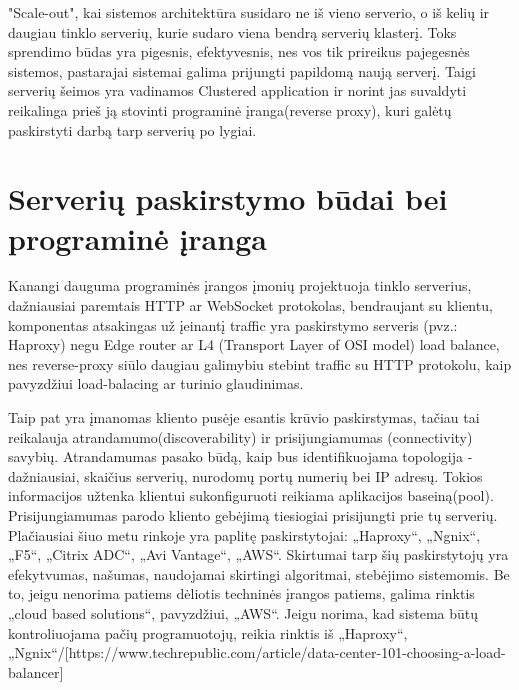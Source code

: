\documentclass{VUMIFPSkursinis}
\begin{document}
"Scale-out", kai sistemos architektūra susidaro ne iš vieno serverio, o iš kelių ir daugiau tinklo serverių, kurie sudaro viena bendrą serverių klasterį. Toks sprendimo būdas yra pigesnis, efektyvesnis, nes vos tik prireikus pajegesnės sistemos, pastarajai sistemai galima prijungti papildomą naują serverį. Taigi serverių šeimos yra vadinamos Clustered application ir norint jas suvaldyti reikalinga prieš ją stovinti programinė įranga(reverse proxy), kuri galėtų paskirstyti darbą tarp serverių po lygiai.

\section{Serverių paskirstymo būdai bei programinė įranga}
Kanangi dauguma programinės įrangos įmonių projektuoja tinklo serverius, dažniausiai paremtais HTTP ar WebSocket protokolas, bendraujant su klientu, komponentas atsakingas už įeinantį traffic yra paskirstymo serveris (pvz.: Haproxy) negu Edge router ar L4 (Transport Layer of OSI model) load balance, nes reverse-proxy siūlo daugiau galimybiu stebint traffic su HTTP protokolu, kaip pavyzdžiui load-balacing ar turinio glaudinimas.

Taip pat yra įmanomas kliento pusėje esantis krūvio paskirstymas, tačiau tai reikalauja atrandamumo(discoverability) ir prisijungiamumas (connectivity) savybių. Atrandamumas pasako būdą, kaip bus identifikuojama topologija - dažniausiai, skaičius serverių, nurodomų portų numerių bei IP adresų. Tokios informacijos užtenka klientui sukonfiguruoti reikiama aplikacijos baseiną(pool). Prisijungiamumas parodo kliento gebėjimą tiesiogiai prisijungti prie tų serverių.
Plačiausiai šiuo metu rinkoje yra paplitę paskirstytojai: „Haproxy“, „Ngnix“, „F5“, „Citrix ADC“, „Avi Vantage“, „AWS“. Skirtumai tarp šių paskirstytojų yra efekytvumas, našumas, naudojamai skirtingi algoritmai, stebėjimo sistemomis. Be to, jeigu nenorima patiems dėliotis techninės įrangos patiems, galima rinktis „cloud based solutions“, pavyzdžiui, „AWS“. Jeigu norima, kad sistema būtų kontroliuojama pačių programuotojų, reikia rinktis iš „Haproxy“, „Ngnix“/[https://www.techrepublic.com/article/data-center-101-choosing-a-load-balancer]
\end{document}
